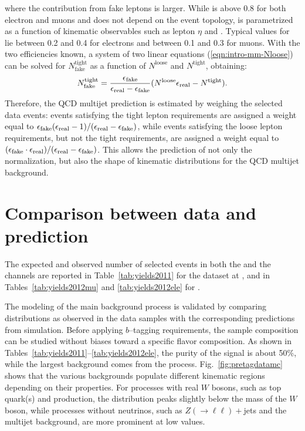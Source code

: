 where the contribution from fake leptons is larger. While \effReal{}
is above 0.8 for both electron and muons and does not depend on the
event topology, \effFake{} is parametrized as a function of kinematic
observables such as lepton $\eta$ and . Typical
values for \effFake{} lie between 0.2 and 0.4 for electrons and
between 0.1 and 0.3 for muons. With the two efficiencies known, a
system of two linear equations (\ref{eqn:intro-mm-Nloose}) can be
solved for $N^{\mathrm{tight}}_\mathrm{fake}$ as a function of
$N^\mathrm{loose}$ and $N^\mathrm{tight}$, obtaining:
%                                                                                             
\begin{equation}
  N^\mathrm{tight}_\mathrm{fake}
  = \frac{\epsilon_{\mathrm{fake}}{}}
  {\epsilon_{\mathrm{real}}{} - \epsilon_{\mathrm{fake}}{}}
  (N^\mathrm{loose} \epsilon_{\mathrm{real}}{} - N^\mathrm{tight}).
  \label{eqn:intro-mm-tight_fake}
\end{equation}
%                                                                                             
Therefore, the QCD multijet prediction is estimated by weighing the
selected data events:
events satisfying the tight lepton requirements are assigned a weight
equal to $\epsilon_{\mathrm{fake}}{}(\epsilon_{\mathrm{real}}{}-1)/(\epsilon_{\mathrm{real}}{}-\epsilon_{\mathrm{fake}}{})$, while
events satisfying the loose lepton requirements, but not the tight
requirements, are assigned a weight equal to
$(\epsilon_{\mathrm{fake}}{}\cdot{}\epsilon_{\mathrm{real}}{})/(\epsilon_{\mathrm{real}}{}-\epsilon_{\mathrm{fake}}{})$. This allows
the prediction of not only the normalization, but also the shape of
kinematic distributions for the QCD multijet background.

\section{Comparison between data and prediction}
\label{sec:datamc}

The expected and observed number of selected events in both the
\mujets{} and the \ejets{} channels are reported in
Table~\ref{tab:yields2011} for the dataset at \seventev{}, and in
Tables~\ref{tab:yields2012mu} and \ref{tab:yields2012ele}  for \eighttev{}.



The modeling of the main background process is validated by comparing
distributions as observed in the data samples with the corresponding
predictions from simulation. 
Before applying $b$--tagging requirements, the sample composition can
be studied without biases toward a specific flavor composition. As
shown in Tables~\ref{tab:yields2011}--\ref{tab:yields2012ele}, 
the purity of the \ttbar{} signal is about
50\%, while the largest background comes from the \wjets{}
process. Fig.~\ref{fig:pretagdatamc} shows that the various
backgrounds populate different kinematic regions depending on their
properties. For processes with real $W$ bosons, such as top quark(s)
and \wjets{} production, the \mtw{} distribution peaks slightly below
the mass of the $W$ boson, while processes without neutrinos, such as
$Z(\to\ell\ell)+$jets and the multijet background, are more prominent
at low \met{} values.
 
